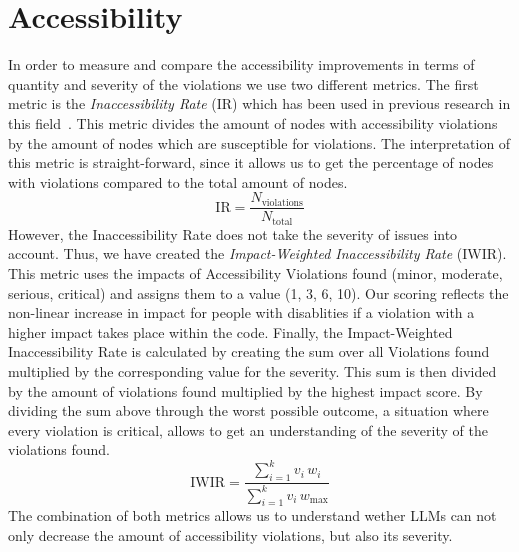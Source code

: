 \section{Accessibility}
In order to measure and compare the accessibility improvements in terms of 
quantity and severity of the violations we use two different metrics.\newline
The first metric is the \textit{Inaccessibility Rate} (IR) which has been used in previous 
research in this field~\parencite{alshayban2020accessibility}. This metric divides the amount of nodes with accessibility 
violations by the amount of nodes which are susceptible for violations. The 
interpretation of this metric is straight-forward, since it allows us to get the 
percentage of nodes with violations compared to the total amount of nodes.\newline
\begin{equation}
    \mathrm{IR} = \frac{N_{\mathrm{violations}}}{N_{\mathrm{total}}}
\end{equation}
However, the Inaccessibility Rate does not take the severity of issues into account.
Thus, we have created the \textit{Impact-Weighted Inaccessibility Rate} (IWIR). This metric 
uses the impacts of Accessibility Violations found (minor, moderate, serious, critical)
and assigns them to a value (1, 3, 6, 10). Our scoring reflects the non-linear 
increase in impact for people with disablities if a violation with a higher 
impact takes place within the code. Finally, the Impact-Weighted Inaccessibility Rate 
is calculated by creating the sum over all Violations found multiplied by the 
corresponding value for the severity. This sum is then divided by the amount of violations
found multiplied by the highest impact score. By dividing the sum above through the worst 
possible outcome, a situation where every violation is critical, allows to get an 
understanding of the severity of the violations found.\newline
\begin{equation}
  \mathrm{IWIR} = 
    \frac{\displaystyle\sum_{i=1}^{k} v_i \, w_i}
         {\displaystyle\sum_{i=1}^{k} v_i \, w_{\mathrm{max}}}
  \label{eq:iwir}
\end{equation}
The combination of both metrics allows us to understand wether LLMs can not only decrease
the amount of accessibility violations, but also its severity.

